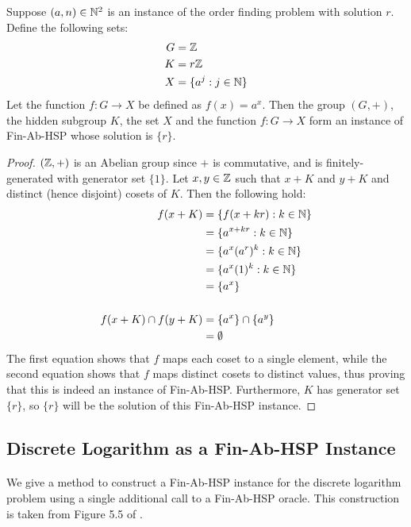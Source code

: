 \begin{lemma}\label{hsp_for_ord_find}
Suppose $(a, n) \in \mathbb{N}^2$ is an instance of the order finding problem with solution $r$.
Define the following sets:
\begin{align*}
    G &= \mathbb{Z}\\
    K &= r\mathbb{Z}\\
    X &= \{a^j : j \in \mathbb{N} \}
\end{align*}
Let the function $f: G \rightarrow X$ be defined as $f(x) = a^x$. Then the group $(G, +)$, the hidden subgroup $K$, the set $X$ and the function $f: G \rightarrow X$ form an instance of Fin-Ab-HSP whose solution is $\{r\}$.
\end{lemma}
\begin{proof}
$(\mathbb{Z}, +)$ is an Abelian group since $+$ is commutative, and is finitely-generated with generator set $\{1\}$. Let $x, y \in \mathbb{Z}$ such that $x+K$ and $y+K$ and distinct (hence disjoint) cosets of $K$. Then the following hold:
\begin{align*}
    f(x+K) &= \{f(x + kr) : k \in \mathbb{N}\}\\
    &= \{a^{x+kr} : k \in \mathbb{N}\}\\
    &= \{a^x (a^r)^k : k \in \mathbb{N}\}\\
    &= \{a^x (1)^k : k \in \mathbb{N}\}\\
    &= \{a^x\}\\\\
    f(x+K) \cap f(y+K) &= \{a^x\} \cap \{a^y\}\\
    &= \emptyset
\end{align*}
The first equation shows that $f$ maps each coset to a single element, while the second equation shows that $f$ maps distinct cosets to distinct values, thus proving that this is indeed an instance of Fin-Ab-HSP. Furthermore, $K$ has generator set $\{r\}$, so $\{r\}$ will be the solution of this Fin-Ab-HSP instance.
\end{proof}

\subsection{Discrete Logarithm as a Fin-Ab-HSP Instance}
\paragraph{}
We give a method to construct a Fin-Ab-HSP instance for the discrete logarithm problem using a single additional call to a Fin-Ab-HSP oracle. This construction is taken from Figure 5.5 of \cite{nielsen2002quantum}.

